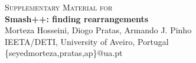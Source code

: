 \begin{titlepage}
\centering
\vspace*{10mm}
\Large\textsc{Supplementary Material for}
\\[3mm]
\huge\textbf{Smash++: finding rearrangements}
\\[10mm]
\Large Morteza Hosseini, Diogo Pratas, Armando J. Pinho
\\[4mm]
\normalsize IEETA/DETI, University of Aveiro, Portugal
\\[2mm]
{\ttfamily\{seyedmorteza,pratas,ap\}@ua.pt}

\vspace{\fill}
\thispagestyle{empty}
\raggedright
{}
\normalsize\tableofcontents
\end{titlepage}